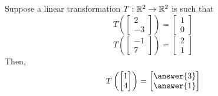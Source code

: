 \documentclass{ximera}
\author{}
\begin{document}
\begin{exercise}
Suppose a linear transformation $T:\mathbb{R}^2\rightarrow\mathbb{R}^2$ is such that 
$$T\left(\begin{bmatrix}2\\-3\end{bmatrix}\right)=\begin{bmatrix}1\\0\end{bmatrix}$$
$$T\left(\begin{bmatrix}-1\\7\end{bmatrix}\right)=\begin{bmatrix}2\\1\end{bmatrix}$$
Then, 
$$T\left(\begin{bmatrix}1\\4\end{bmatrix}\right)=\begin{bmatrix}\answer{3}\\\answer{1}\end{bmatrix}$$

 \end{exercise}
 
\end{document}
